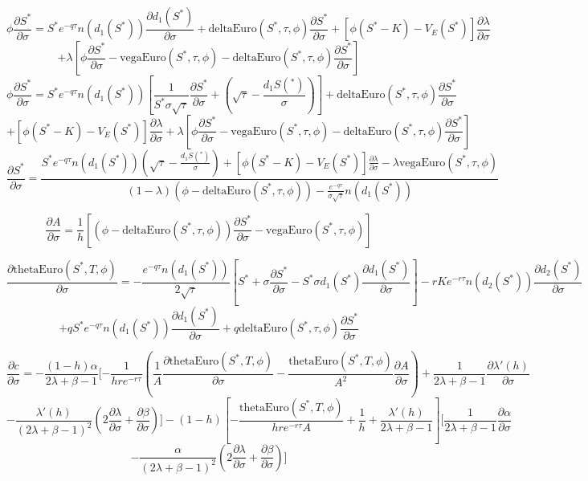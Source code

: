 \documentclass[preprint,12pt,1p]{elsarticle}
\begin{document}
\begin{spacing}{1.3}
$$\phi \frac{\partial S^*}{\partial \sigma} = S^* e^{-q\tau}n(d_1(S^*))\frac{\partial d_1(S^*)}{\partial \sigma} + \text{deltaEuro}(S^*, \tau, \phi) \frac{\partial S^*}{\partial \sigma} + [\phi (S^*-K) - V_E(S^*)]\frac{\partial \lambda}{\partial \sigma} $$ $$+ \lambda \left[ \phi \frac{\partial S^*}{\partial \sigma} - \text{vegaEuro}(S^*, \tau, \phi) - \text{deltaEuro}(S^*, \tau, \phi)\frac{\partial S^*}{\partial \sigma}\right]$$
$$\phi \frac{\partial S^*}{\partial \sigma} = S^* e^{-q\tau}n(d_1(S^*))\left[\frac{1}{S^*\sigma \sqrt{\tau}}\frac{\partial S^*}{\partial \sigma} + (\sqrt{\tau} - \frac{d_1S(^*)}{\sigma}) \right] + \text{deltaEuro}(S^*, \tau, \phi) \frac{\partial S^*}{\partial \sigma}$$ $$ + [\phi (S^*-K) - V_E(S^*)]\frac{\partial \lambda}{\partial \sigma} + \lambda \left[ \phi \frac{\partial S^*}{\partial \sigma} - \text{vegaEuro}(S^*, \tau, \phi) - \text{deltaEuro}(S^*, \tau, \phi)\frac{\partial S^*}{\partial \sigma}\right]$$
$$\frac{\partial S^*}{\partial \sigma} = \frac{S^* e^{-q\tau}n(d_1(S^*))\left(\sqrt{\tau} - \frac{d_1S(^*)}{\sigma} \right) + \left[\phi (S^*-K) - V_E(S^*)\right]\frac{\partial \lambda}{\partial \sigma} - \lambda \text{vegaEuro}(S^*, \tau, \phi) }{(1-\lambda)(\phi-\text{deltaEuro}(S^*, \tau, \phi)) - \frac{e^{-q\tau}}{\sigma \sqrt{\tau}} n(d_1(S^*))}$$

$$\frac{\partial A}{\partial \sigma} = \frac{1}{h} \left[(\phi - \text{deltaEuro}(S^*, \tau, \phi))\frac{\partial S^*}{\partial \sigma} - \text{vegaEuro}(S^*, \tau, \phi) \right]$$

$$\frac{\partial \text{thetaEuro}(S^*,T,\phi)}{\partial \sigma} = - \frac{e^{-q\tau}n(d_1(S^*))}{2\sqrt{\tau}} \left[S^*+ \sigma \frac{\partial S^*}{\partial \sigma} - S^* \sigma d_1(S^*)\frac{\partial d_1(S^*)}{\partial \sigma}\right] - rKe^{-r\tau}n(d_2(S^*))\frac{\partial d_2(S^*)}{\partial \sigma}$$ $$ +  qS^*e^{-q\tau}n(d_1(S^*))\frac{\partial d_1(S^*)}{\partial \sigma} + q \text{deltaEuro}(S^*, \tau, \phi) \frac{\partial S^*}{\partial \sigma} $$ 

$$\frac{\partial c}{\partial \sigma} = -\frac{(1-h)\alpha}{2\lambda + \beta - 1} [ - \frac{1}{hre^{-r\tau}} \left(\frac{1}{A} \frac{\partial \text{thetaEuro}(S^*,T,\phi)}{\partial \sigma} - \frac{\text{thetaEuro}(S^*,T,\phi)}{A^2} \frac{\partial A}{\partial \sigma} \right) + \frac{1}{2\lambda + \beta -1} \frac{\partial \lambda'(h)}{\partial \sigma} $$ $$- \frac{\lambda'(h)}{(2\lambda + \beta -1)^2}(2\frac{\partial \lambda}{\partial \sigma} + \frac{\partial \beta}{\partial \sigma} ) ] - (1-h) \left[-\frac{\text{thetaEuro}(S^*,T,\phi)}{hre^{-r\tau}A} + \frac{1}{h} + \frac{\lambda'(h)}{2\lambda + \beta -1} \right][\frac{1}{2\lambda + \beta -1} \frac{\partial \alpha}{\partial \sigma}$$ $$ - \frac{\alpha}{(2\lambda + \beta -1)^2}(2\frac{\partial \lambda}{\partial \sigma} + \frac{\partial \beta}{\partial \sigma})] $$


\end{spacing}
\end{document}
